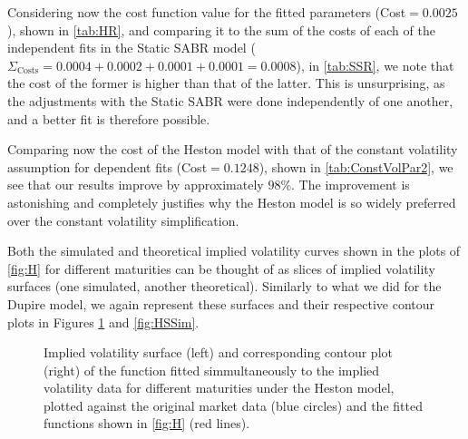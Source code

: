 Considering now the cost function value for the fitted parameters (Cost$=0.0025$), shown in \autoref{tab:HR}, and comparing it to the sum of the costs of each of the independent fits in the Static SABR model ($\Sigma_{\mathrm{Costs}}=0.0004+0.0002+0.0001+0.0001=0.0008$), in \autoref{tab:SSR}, we note that the cost of the former is higher than that of the latter.
This is unsurprising, as the adjustments with the Static SABR were done independently of one another, and a better fit is therefore possible.

Comparing now the cost of the Heston model with that of the constant volatility assumption for dependent fits (Cost$=0.1248$), shown in \autoref{tab:ConstVolPar2}, we see that our results improve by approximately $98\%$. The improvement is astonishing and completely justifies why the Heston model is so widely preferred over the constant volatility simplification.


Both the simulated and theoretical implied volatility curves shown in the plots of \autoref{fig:H} for different maturities can be thought of as slices of implied volatility surfaces (one simulated, another theoretical). Similarly to what we did for the Dupire model, we again represent these surfaces and their respective contour plots in Figures \ref{fig:HS} and \ref{fig:HSSim}.


\begin{figure}[H]
  \begin{subfigmatrix}{2}
  \end{subfigmatrix}
    \caption[Implied volatility surface and corresponding contour plot of the function fitted simmultaneously to the implied volatility data for different maturities under the Heston model, plotted against the original market data and the fitted functions shown in \autoref{fig:H}.]{Implied volatility surface (left) and corresponding contour plot (right) of the function fitted simmultaneously to the implied volatility data for different maturities under the Heston model, plotted against the original market data (blue circles) and the fitted functions shown in \autoref{fig:H} (red lines).}\label{fig:HS}
\end{figure}   

\vspace{\fill}
\newpage

